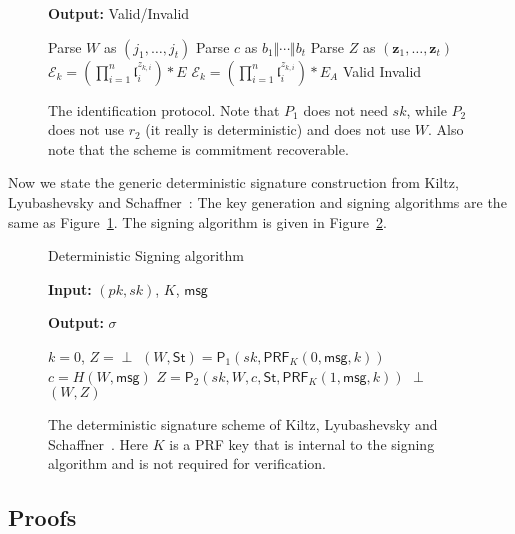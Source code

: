 \documentclass{llncs}
\newcommand{\E}{\mathcal{E}}
\newcommand{\msg}{\mathsf{msg}}
\renewcommand{\l}{\mathfrak{l}}
\newcommand{\z}{\mathbf{z}}
\newcommand{\PP}{\mathsf{P}}
\newcommand{\St}{\textsf{St}}
\newcommand{\PRF}{\mathsf{PRF}}
\begin{document}
\begin{figure}
\begin{minipage}{0.45\textwidth}
\begin{algorithm}[H]
	\textbf{Output:} Valid/Invalid

	\begin{algorithmic}[1]
		\State Parse $W$ as $(j_1 , \dots, j_t)$
		\State Parse $c$ as $b_1 \Vert \cdots \Vert b_t$
		\State Parse $Z$ as $(\z_1, \dots, \z_t)$
		\State $\E_k = ( \prod_{i=1}^n \l_i^{z_{k,i}} ) * E$
		\Else
		\State $\E_k = ( \prod_{i=1}^n \l_i^{z_{k,i}} ) * E_A$
		\EndIf
		\EndFor
		\If{$(j_1, \dots, j_t) = (j(\E_1) , \dots, j(\E_t))$} \State \Return Valid
		\Else \State \Return Invalid \EndIf
	\end{algorithmic}
\end{algorithm}
\end{minipage}
\caption{The identification protocol. Note that $P_1$ does not need $sk$, while $P_2$ does not use $r_2$ (it really is deterministic) and does not use $W$. Also note that the scheme is commitment recoverable. \label{fig:id-scheme}}
\end{figure}


Now we state the generic deterministic signature construction from Kiltz, Lyubashevsky and Schaffner~\cite{KLS18}:
The key generation and signing algorithms are the same as Figure~\ref{fig:id-scheme}. The signing algorithm is given in Figure~\ref{fig:sign}. 

\begin{figure}
\begin{algorithm}[H]
	\caption{Deterministic Signing algorithm}
	\textbf{Input:} $(pk,sk)$, $K$, $\msg$

	\textbf{Output:} $\sigma$

	\begin{algorithmic}[1]
		\State $k = 0$, $Z = \perp$
		\State $(W,\St) = \PP_1( sk, \PRF_K( 0, \msg, k ))$
		\State $c = H( W, \msg )$ 
		\State $Z = \PP_2( sk, W, c, \St, \PRF_K( 1, \msg, k ))$
		\EndWhile
		\State \Return $\perp$
		\Else
		\State \Return $(W,Z)$
		\EndIf
	\end{algorithmic}
\end{algorithm}
\caption{The deterministic signature scheme of Kiltz, Lyubashevsky and Schaffner~\cite{KLS18}. Here $K$ is a PRF key that is internal to the signing algorithm and is not required for verification. \label{fig:sign}}
\end{figure}


\subsection{Proofs}
\end{document}
